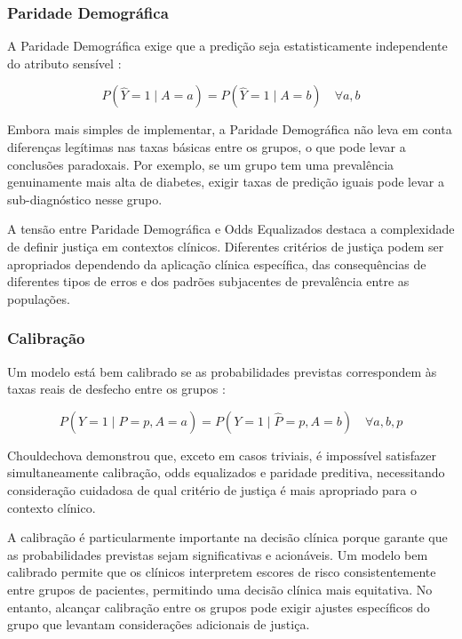 \subsubsection{Paridade Demográfica}

A Paridade Demográfica exige que a predição seja estatisticamente 
independente do atributo sensível \cite{dwork2012}:

\begin{equation}
P(\hat{Y}=1 \mid A=a) = P(\hat{Y}=1 \mid A=b) \quad \forall a,b
\label{eq:dp}
\end{equation}

Embora mais simples de implementar, a Paridade Demográfica não leva em 
conta diferenças legítimas nas taxas básicas entre os grupos, o que pode 
levar a conclusões paradoxais. Por exemplo, se um grupo tem uma prevalência 
genuinamente mais alta de diabetes, exigir taxas de predição iguais pode 
levar a sub-diagnóstico nesse grupo.

A tensão entre Paridade Demográfica e Odds Equalizados destaca a 
complexidade de definir justiça em contextos clínicos. Diferentes critérios 
de justiça podem ser apropriados dependendo da aplicação clínica específica, 
das consequências de diferentes tipos de erros e dos padrões subjacentes 
de prevalência entre as populações.

\subsubsection{Calibração}

Um modelo está bem calibrado se as probabilidades previstas correspondem 
às taxas reais de desfecho entre os grupos \cite{chouldechova2017}:

\begin{equation}
P(Y=1 \mid \hat{P}=p, A=a) = P(Y=1 \mid \hat{P}=p, A=b) \quad \forall a,b,p
\label{eq:cal}
\end{equation}

Chouldechova \cite{chouldechova2017} demonstrou que, exceto em casos 
triviais, é impossível satisfazer simultaneamente calibração, odds 
equalizados e paridade preditiva, necessitando consideração cuidadosa 
de qual critério de justiça é mais apropriado para o contexto clínico.

A calibração é particularmente importante na decisão clínica porque 
garante que as probabilidades previstas sejam significativas e acionáveis. 
Um modelo bem calibrado permite que os clínicos interpretem escores de 
risco consistentemente entre grupos de pacientes, permitindo uma decisão 
clínica mais equitativa. No entanto, alcançar calibração entre os grupos 
pode exigir ajustes específicos do grupo que levantam considerações 
adicionais de justiça.

